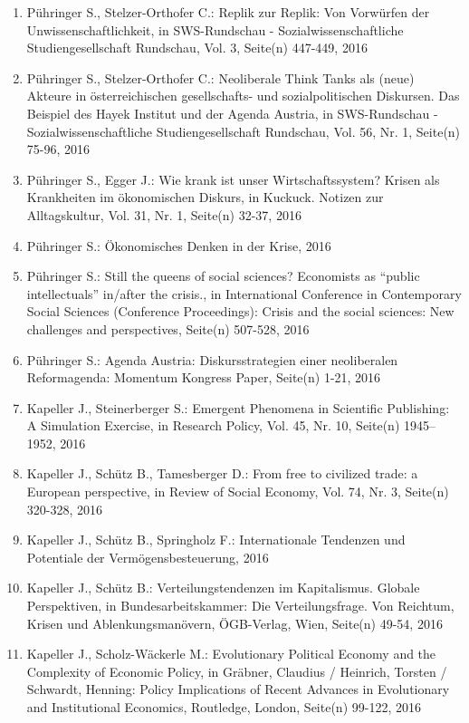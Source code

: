 \begin{enumerate}
	 \item Pühringer S., Stelzer-Orthofer C.: Replik zur Replik: Von Vorwürfen der Unwissenschaftlichkeit, in SWS-Rundschau - Sozialwissenschaftliche Studiengesellschaft Rundschau, Vol. 3, Seite(n) 447-449, 2016
	 \item Pühringer S., Stelzer-Orthofer C.: Neoliberale Think Tanks als (neue) Akteure in österreichischen gesellschafts- und sozialpolitischen Diskursen. Das Beispiel des Hayek Institut und der Agenda Austria, in SWS-Rundschau - Sozialwissenschaftliche Studiengesellschaft Rundschau, Vol. 56, Nr. 1, Seite(n) 75-96, 2016
	 \item Pühringer S., Egger J.: Wie krank ist unser Wirtschaftssystem? Krisen als Krankheiten im ökonomischen Diskurs, in Kuckuck. Notizen zur Alltagskultur, Vol. 31, Nr. 1, Seite(n) 32-37, 2016
	 \item Pühringer S.: Ökonomisches Denken in der Krise, 2016
	 \item Pühringer S.: Still the queens of social sciences? Economists as “public intellectuals” in/after the crisis., in International Conference in Contemporary Social Sciences (Conference Proceedings): Crisis and the social sciences: New challenges and perspectives, Seite(n) 507-528, 2016
	 \item Pühringer S.: Agenda Austria: Diskursstrategien einer neoliberalen Reformagenda: Momentum Kongress Paper, Seite(n) 1-21, 2016
	 \item Kapeller J., Steinerberger S.: Emergent Phenomena in Scientific Publishing: A Simulation Exercise, in Research Policy, Vol. 45, Nr. 10, Seite(n) 1945–1952, 2016
	 \item Kapeller J., Schütz B., Tamesberger D.: From free to civilized trade: a European perspective, in Review of Social Economy, Vol. 74, Nr. 3, Seite(n) 320-328, 2016
	 \item Kapeller J., Schütz B., Springholz F.: Internationale Tendenzen und Potentiale der Vermögensbesteuerung, 2016
	 \item Kapeller J., Schütz B.: Verteilungstendenzen im Kapitalismus. Globale Perspektiven, in Bundesarbeitskammer: Die Verteilungsfrage. Von Reichtum, Krisen und Ablenkungsmanövern, ÖGB-Verlag, Wien, Seite(n) 49-54, 2016
	 \item Kapeller J., Scholz-Wäckerle M.: Evolutionary Political Economy and the Complexity of Economic Policy, in Gräbner,  Claudius / Heinrich, Torsten / Schwardt, Henning: Policy  Implications of Recent Advances in Evolutionary and Institutional  Economics, Routledge, London, Seite(n) 99-122, 2016

\end{enumerate}
